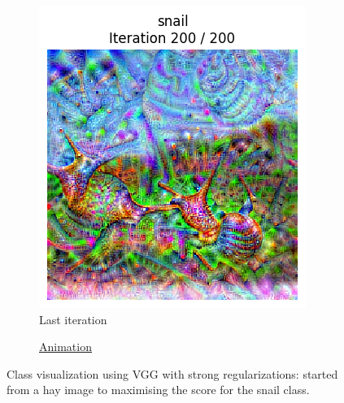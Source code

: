 \begin{figure}[H]
    \centering
    \begin{subfigure}{.5\textwidth}
        \centering
        \includegraphics[width=.7\linewidth]{VGG/VGG_snail_animated_init_img_reg++_last_frame.png}
        \caption{Last iteration}
        \label{fig:class_viz_start_image_dif_VGG:png}
    \end{subfigure}%
    \begin{subfigure}{.5\textwidth}
        \centering
        \caption{\href{figs/2b/VGG/VGG_snail_animated_init_img_reg++.gif}{Animation}}
        \label{fig:class_viz_start_image_dif_VGG:vid}
    \end{subfigure}
    \caption{Class visualization using VGG with strong regularizations: started from a hay image to maximising the score for the snail class.}
    \label{fig:class_viz_start_image_dif_VGG}
\end{figure}

